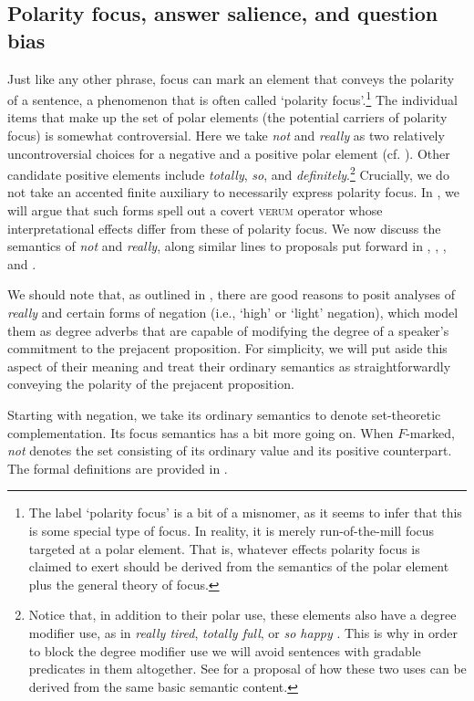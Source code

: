 \documentclass[output=paper,colorlinks,citecolor=brown]{langscibook}
\begin{document}
\subsection{Polarity focus, answer salience, and question bias}\label{Pol.Foc}
Just like any other phrase, focus can mark an element that conveys the polarity of a sentence, a phenomenon that is often called `polarity focus'.\footnote{The label `polarity focus' is a bit of a misnomer, as it seems to infer that this is some special type of focus. In reality, it is merely run-of-the-mill focus targeted at a polar element. That is, whatever effects polarity focus is claimed to exert should be derived from the semantics of the polar element plus the general theory of focus.}  The individual items that make up the set of polar elements (the potential carriers of polarity focus) is somewhat controversial. Here we take \textit{not} and \textit{really} as two relatively uncontroversial choices for a negative and a positive polar element (cf. \citealt{romero2004}). Other candidate positive elements include \textit{totally}, \textit{so}, and \textit{definitely}.\footnote{Notice that, in addition to their polar use, these elements also have a degree modifier use, as in \textit{really tired}, \textit{totally full}, or \textit{so happy} \citep{romero2004, Beltrama2018}. This is why in order to block the degree modifier use we will avoid sentences with gradable predicates in them altogether. See \citet{Bill2022} for a proposal of how these two uses can be derived from the same basic semantic content.} Crucially, we do not take an accented finite auxiliary to necessarily express polarity focus. In , we will argue that such forms spell out a covert \textsc{verum} operator whose interpretational effects differ from these of polarity focus. We now discuss the semantics of \textit{not} and \textit{really}, along similar lines to proposals put forward in \citet{Wilder2013}, \citet{Samko2016}, \citet{Goodhue2018a}, and \citet{Gutzmann2020}.

We should note that, as outlined in \citet{Bill2022}, there are good reasons to posit analyses of \textit{really} and certain forms of negation (i.e., `high' or `light' negation), which model them as degree adverbs that are capable of modifying the degree of a speaker's commitment to the prejacent proposition. For simplicity, we will put aside this aspect of their meaning and treat their ordinary semantics as straightforwardly conveying the polarity of the prejacent proposition.  

Starting with negation, we take its ordinary semantics to denote set-theoretic complementation. Its focus semantics has a bit more going on. When $F$-marked, \textit{not} denotes the set consisting of its ordinary value and its positive counterpart. The formal definitions are provided in .   
\end{document}
